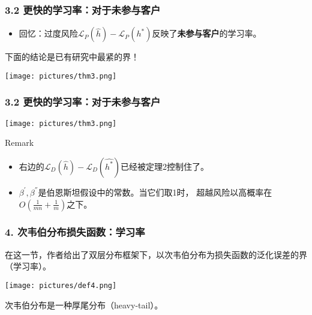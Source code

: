 \documentclass{beamer}
\begin{document}
\begin{frame}
    \frametitle{3.2 更快的学习率：对于未参与客户}
    \begin{itemize}
        \item 回忆：过度风险$\mathcal{L}_{P}(\hat{h})-\mathcal{L}_{P}(h^{*})$反映了\textbf{未参与客户}的学习率。
    \end{itemize}
    \pause
    下面的结论是已有研究中最紧的界！
    \begin{center}
        \texttt{[image: pictures/thm3.png]}
    \end{center}

\end{frame}

\begin{frame}
    \frametitle{3.2 更快的学习率：对于未参与客户}
    \begin{center}
        \texttt{[image: pictures/thm3.png]}
    \end{center}
    \begin{alertblock}{Remark}
        \begin{itemize}
            \item 右边的$\mathcal{L}_{D}(\hat{h})-\mathcal{L}_{D}(\hat{h^{*}})$已经被定理2控制住了。
            \item $\beta^{'},\beta^{''}$是伯恩斯坦假设中的常数。当它们取1时，
            超越风险以高概率在$O(\frac{1}{mn}+\frac{1}{m})$之下。
        \end{itemize}
    \end{alertblock}
\end{frame}

\begin{frame}
    \frametitle{4. 次韦伯分布损失函数：学习率}
    在这一节，作者给出了双层分布框架下，以次韦伯分布为损失函数的泛化误差的界（学习率）。
    \begin{definition}[次韦伯分布]
        \texttt{[image: pictures/def4.png]}
    \end{definition}
    \pause
    次韦伯分布是一种厚尾分布（heavy-tail）。
\end{frame}
\end{document}
